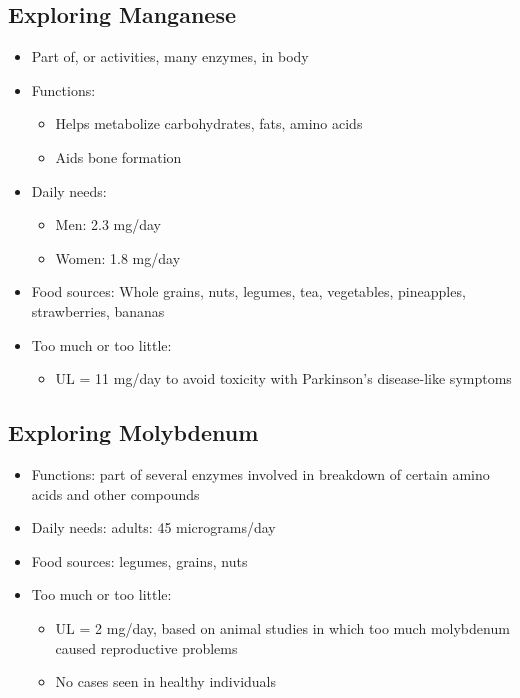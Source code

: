 \documentclass[12pt]{article}
\begin{document}
        \subsection{Exploring Manganese}
            \begin{itemize}
                \item Part of, or activities, many enzymes, in body
                \item Functions:
                    \begin{itemize}
                        \item Helps metabolize carbohydrates, fats, amino acids
                        \item Aids bone formation
                    \end{itemize}
                \item Daily needs:
                    \begin{itemize}
                        \item Men: 2.3 mg/day
                        \item Women: 1.8 mg/day
                    \end{itemize}
                \item Food sources: Whole grains, nuts, legumes, tea, vegetables, pineapples, strawberries, bananas
                \item Too much or too little:
                    \begin{itemize}
                        \item UL = 11 mg/day to avoid toxicity with Parkinson's disease-like symptoms
                    \end{itemize}
            \end{itemize}

        \subsection{Exploring Molybdenum}
            \begin{itemize}
                \item Functions: part of several enzymes involved in breakdown of certain amino acids and other compounds
                \item Daily needs: adults: 45 micrograms/day
                \item Food sources: legumes, grains, nuts
                \item Too much or too little:
                    \begin{itemize}
                        \item UL = 2 mg/day, based on animal studies in which too much molybdenum caused reproductive problems
                        \item No cases seen in healthy individuals
                    \end{itemize}
            \end{itemize}
\end{document}
